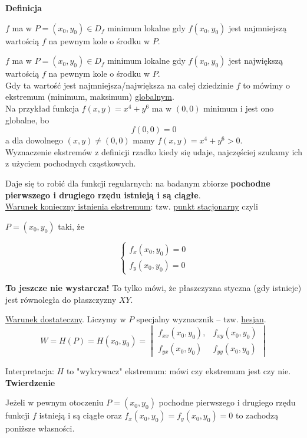 \textbf{Definicja}

$f$ ma w $ P = (x_0, y_0) \in D_f $ minimum lokalne gdy $ f(x_0, y_0) $ jest najmniejszą wartością $f$ na pewnym kole o środku w $P$.

$f$ ma w $ P = (x_0, y_0) \in D_f $ minimum lokalne gdy $ f(x_0, y_0) $ jest największą wartością $f$ na pewnym kole o środku w $P$. \\

Gdy ta wartość jest najmniejsza/największa na całej dziedzinie $f$ to mówimy o ekstremum (minimum, maksimum) \underline{globalnym}. \\

Na przykład funkcja $ f(x,y) = x^4 + y^6 $ ma w $(0,0)$ minimum i jest ono globalne, bo
$$ f(0,0) = 0 $$
a dla dowolnego $ (x,y) \neq (0,0) $ mamy $ f(x,y) = x^4 + y^6 > 0 $. \\

Wyznaczenie ekstremów z definicji rzadko kiedy się udaje, najczęściej szukamy ich z użyciem pochodnych cząstkowych.

Daje się to robić dla funkcji regularnych: na badanym zbiorze \textbf{pochodne pierwszego i drugiego rzędu istnieją i są ciągłe}. \\

\underline{Warunek konieczny istnienia ekstremum}: tzw. \underline{punkt stacjonarny} czyli

$ P = (x_0, y_0) $ taki, że 

$$ \left\{ \begin{aligned} f_x(x_0, y_0) = 0 \\ f_y(x_0, y_0) = 0  \end{aligned} \right. $$

\textbf{To jeszcze nie wystarcza!} To tylko mówi, że płaszczyzna styczna (gdy istnieje) jest równoległa do płaszczyzny $XY$.

\underline{Warunek dostateczny}. Liczymy w $P$ specjalny wyznacznik -- tzw. \underline{hesjan}.
$$ W = H(P) = H(x_0, y_0) = \begin{vmatrix} f_{xx}(x_0, y_0), & f_{xy}(x_0, y_0) \\ f_{yx}(x_0, y_0) & f_{yy}(x_0, y_0) \end{vmatrix} $$

Interpretacja: $H$ to "wykrywacz" ekstremum: mówi czy ekstremum jest czy nie. \\

\textbf{Twierdzenie}

Jeżeli w pewnym otoczeniu $ P = (x_0, y_0) $ pochodne pierwszego i drugiego rzędu funkcji $f$ istnieją i są ciągłe oraz
$ f_x(x_0, y_0) = f_y(x_0, y_0) = 0 $ to zachodzą poniższe własności.

